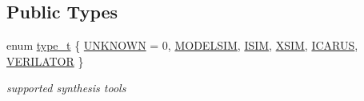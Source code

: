 \subsection*{Public Types}
\begin{DoxyCompactItemize}
\item 
enum \hyperlink{classSimulationTool_a6f5b094bef3306e5611c0a3a9ade0a0c}{type\+\_\+t} \{ \newline
\hyperlink{classSimulationTool_a6f5b094bef3306e5611c0a3a9ade0a0cac1cba912dcb2a91c32cee75049def6cc}{U\+N\+K\+N\+O\+WN} = 0, 
\hyperlink{classSimulationTool_a6f5b094bef3306e5611c0a3a9ade0a0cadf59d544b5c7d7ee624878e4491da2f1}{M\+O\+D\+E\+L\+S\+IM}, 
\hyperlink{classSimulationTool_a6f5b094bef3306e5611c0a3a9ade0a0ca83011b682e06c1fd8dae495401417a4e}{I\+S\+IM}, 
\hyperlink{classSimulationTool_a6f5b094bef3306e5611c0a3a9ade0a0ca7e65f98e613bf8008d68c591f5383d29}{X\+S\+IM}, 
\newline
\hyperlink{classSimulationTool_a6f5b094bef3306e5611c0a3a9ade0a0caa1a358c038890fa1e2fc515928f9cf79}{I\+C\+A\+R\+US}, 
\hyperlink{classSimulationTool_a6f5b094bef3306e5611c0a3a9ade0a0ca2bd24b5521f81400d26c5c972401542d}{V\+E\+R\+I\+L\+A\+T\+OR}
 \}\begin{DoxyCompactList}\small\item\em supported synthesis tools \end{DoxyCompactList}
\end{DoxyCompactItemize}

